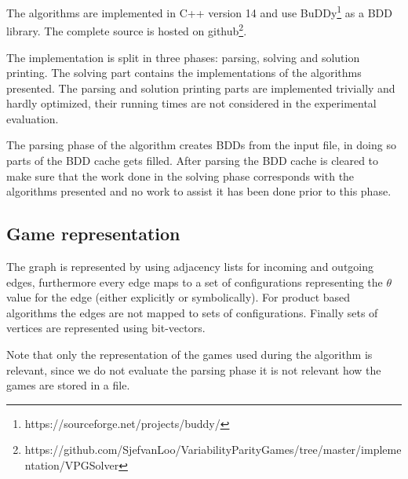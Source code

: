 The algorithms are implemented in C++ version 14 and use BuDDy\footnote{\label{note1}https://sourceforge.net/projects/buddy/} as a BDD library. The complete source is hosted on github\footnote{\label{note2}https://github.com/SjefvanLoo/VariabilityParityGames/tree/master/implementation/VPGSolver}.

The implementation is split in three phases: parsing, solving and solution printing. The solving part contains the implementations of the algorithms presented. The parsing and solution printing parts are implemented trivially and hardly optimized, their running times are not considered in the experimental evaluation.

The parsing phase of the algorithm creates BDDs from the input file, in doing so parts of the BDD cache gets filled. After parsing the BDD cache is cleared to make sure that the work done in the solving phase corresponds with the algorithms presented and no work to assist it has been done prior to this phase.

\subsection{Game representation}
The graph is represented by using adjacency lists for incoming and outgoing edges, furthermore every edge maps to a set of configurations representing the $\theta$ value for the edge (either explicitly or symbolically). For product based algorithms the edges are not mapped to sets of configurations. Finally sets of vertices are represented using bit-vectors.

Note that only the representation of the games used during the algorithm is relevant, since we do not evaluate the parsing phase it is not relevant how the games are stored in a file.
